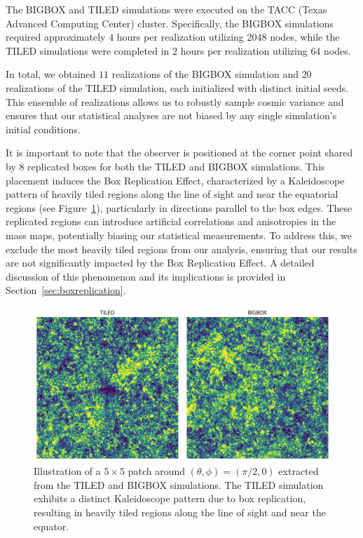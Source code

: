 The BIGBOX and TILED simulations were executed on the TACC (Texas Advanced Computing Center) cluster. Specifically, the BIGBOX simulations required approximately $4$ hours per realization utilizing $2048$ nodes, while the TILED simulations were completed in $2$ hours per realization utilizing $64$ nodes. 

In total, we obtained $11$ realizations of the BIGBOX simulation and $20$ realizations of the TILED simulation, each initialized with distinct initial seeds. This ensemble of realizations allows us to robustly sample cosmic variance and ensures that our statistical analyses are not biased by any single simulation's initial conditions. 

It is important to note that the observer is positioned at the corner point shared by $8$ replicated boxes for both the TILED and BIGBOX simulations. This placement induces the Box Replication Effect, characterized by a Kaleidoscope pattern of heavily tiled regions along the line of sight and near the equatorial regions (see Figure~\ref{fig:boxreplication_patch}), particularly in directions parallel to the box edges. These replicated regions can introduce artificial correlations and anisotropies in the mass maps, potentially biasing our statistical measurements. To address this, we exclude the most heavily tiled regions from our analysis, ensuring that our results are not significantly impacted by the Box Replication Effect. A detailed discussion of this phenomenon and its implications is provided in Section~\ref{sec:boxreplication}.

\begin{figure}[ht]
    \centering
    \includegraphics[width=\textwidth]{figures/samplepatch.png}
    \caption{Illustration of a $5 \times 5$ patch around $(\theta, \phi)= (\pi/2, 0)$ extracted from the TILED and BIGBOX simulations. The TILED simulation exhibits a distinct Kaleidoscope pattern due to box replication, resulting in heavily tiled regions along the line of sight and near the equator.} 
    \label{fig:boxreplication_patch}
\end{figure}

